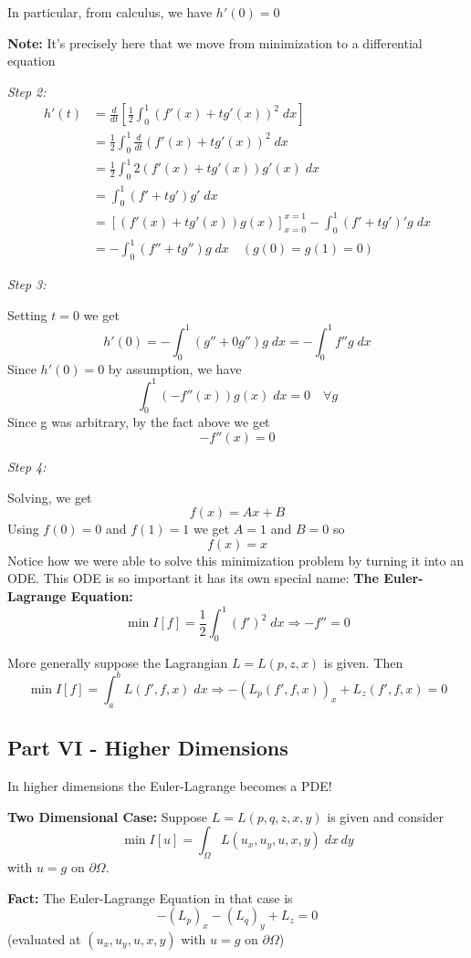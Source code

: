 \documentclass[12pt]{article}
\begin{document}
In particular, from calculus, we have $h'(0) = 0$

\textbf{Note:} It's precisely here that we move from minimization to a differential equation

\emph{Step 2:}
\begin{align*}
    h'(t) &= \frac{d}{dt}\left[\frac{1}{2}\int_0^1 (f'(x) + tg'(x))^2 \; dx\right]\\
    &= \frac{1}{2}\int_0^1 \frac{d}{dt}(f'(x) + tg'(x))^2\; dx\\
    &= \frac{1}{2}\int_0^1 2(f'(x) + tg'(x))g'(x)\; dx\\
    &= \int_0^1 (f' + tg') g' \; dx\\
    &= [(f'(x) + tg'(x))g(x)]_{x=0}^{x=1} - \int_0^1 (f' + tg')' g\; dx\\
    &= - \int_0^1 (f'' + tg'')g\; dx \quad (g(0) = g(1) = 0)
\end{align*}

\emph{Step 3:} 

Setting $t = 0$ we get 
\[h'(0) = -\int_0^1 (g'' + 0g'')g\; dx = -\int_0^1 f''g\; dx\]
Since $h'(0) = 0$ by assumption, we have 
\[\int_0^1 (-f''(x))g(x)\; dx = 0 \quad \forall g\]
Since g was arbitrary, by the fact above we get 
\[-f''(x) = 0\]

\emph{Step 4:}

Solving, we get 
\[f(x) = Ax + B\]
Using $f(0) = 0$ and $f(1) = 1$ we get $A = 1$ and $B = 0$ so 
\[f(x) = x\]
Notice how we were able to solve this minimization problem by turning it into an ODE. This ODE is so important it has its own special name:
\textbf{The Euler-Lagrange Equation:} 
\[\boxed{\min I[f] = \frac{1}{2}\int_0^1 (f')^2\; dx \Longrightarrow -f'' = 0}\]

More generally suppose the Lagrangian $L = L(p, z, x)$ is given. Then 
\[\boxed{\min I[f] = \int_a^b L(f', f, x)\; dx \Longrightarrow -(L_p(f', f, x))_x+ L_z(f', f, x) = 0}\]

\subsection*{Part VI - Higher Dimensions}
In higher dimensions the Euler-Lagrange becomes a PDE!

\textbf{Two Dimensional Case:}
Suppose $L = L(p, q, z, x, y)$ is given and consider 
\[\min I[u] = \int_{\Omega} L(u_x, u_y, u, x, y)\; dx\, dy\]
with $u = g$ on $\partial \Omega$. 

\textbf{Fact:}
The Euler-Lagrange Equation in that case is 
\[-(L_p)_x - (L_q)_y + L_z = 0\]
(evaluated at $(u_x, u_y, u, x, y)$ with $u = g$ on $\partial \Omega$) 
\end{document}

